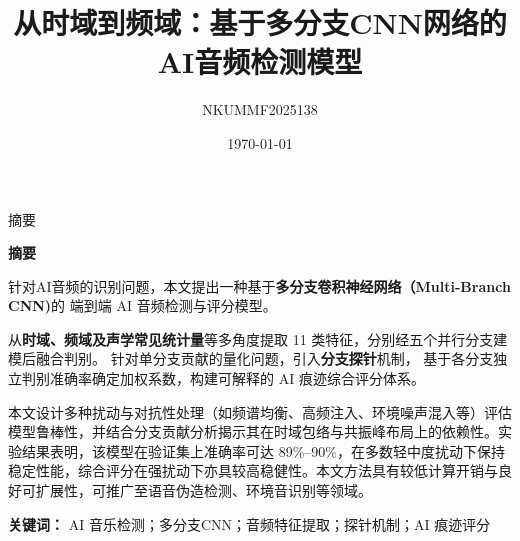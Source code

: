 \documentclass[aspectratio=169]{beamer}
\title{从时域到频域：基于多分支CNN网络的AI音频检测模型}
\author{NKUMMF2025138}
\date{\today}
\begin{document}
\begin{frame}
  \titlepage
\end{frame}


\begin{frame}{摘要}
\small

\begin{center}
  \textbf{\huge 摘\quad 要}
\end{center}
\vspace{0.2cm}

针对AI音频的识别问题，本文提出一种基于\textbf{多分支卷积神经网络（Multi-Branch CNN)}的
端到端 AI 音频检测与评分模型。

从\textbf{时域、频域及声学常见统计量}等多角度提取 11 类特征，分别经五个并行分支建模后融合判别。
针对单分支贡献的量化问题，引入\textbf{分支探针}机制，
基于各分支独立判别准确率确定加权系数，构建可解释的 AI 痕迹综合评分体系。

本文设计多种扰动与对抗性处理（如频谱均衡、高频注入、环境噪声混入等）评估模型鲁棒性，并结合分支贡献分析揭示其在时域包络与共振峰布局上的依赖性。实验结果表明，该模型在验证集上准确率可达 89\%–90\%，在多数轻中度扰动下保持稳定性能，综合评分在强扰动下亦具较高稳健性。本文方法具有较低计算开销与良好可扩展性，可推广至语音伪造检测、环境音识别等领域。


\vspace{0.5em}
\noindent\textbf{关键词：} AI 音乐检测；多分支CNN；音频特征提取；探针机制；AI 痕迹评分

\end{frame}
\end{document}
